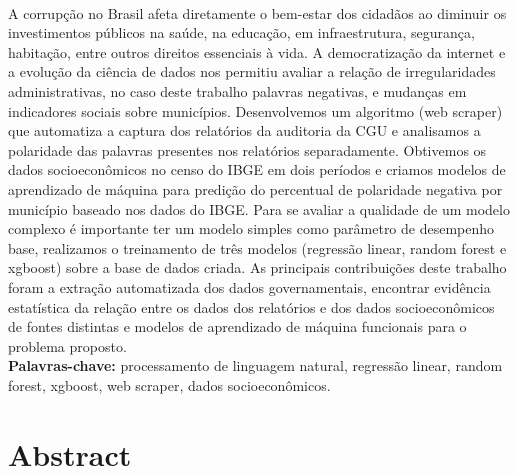 \documentclass[12pt,twoside,a4paper]{book}
\begin{document}
\\

A corrupção no Brasil afeta diretamente o bem-estar dos cidadãos ao diminuir os investimentos públicos na saúde, na educação, em infraestrutura, segurança, habitação, entre outros direitos essenciais à vida. A democratização da internet e a evolução da ciência de dados nos permitiu avaliar a relação de irregularidades administrativas, no caso deste trabalho palavras negativas, e mudanças em indicadores sociais sobre municípios. Desenvolvemos um algoritmo (web scraper) que automatiza a captura dos relatórios da auditoria da CGU e analisamos a polaridade das palavras presentes nos relatórios separadamente. Obtivemos os dados socioeconômicos no censo do IBGE em dois períodos e criamos modelos de aprendizado de máquina para predição do percentual de polaridade negativa por município baseado nos dados do IBGE. Para se avaliar a qualidade de um modelo complexo é importante ter um modelo simples como parâmetro de desempenho base, realizamos o treinamento de três modelos (regressão linear, random forest e xgboost) sobre a base de dados criada. As principais contribuições deste trabalho foram a extração automatizada dos dados governamentais, encontrar evidência estatística da relação entre os dados dos relatórios e dos dados socioeconômicos de fontes distintas e modelos de aprendizado de máquina funcionais para o problema proposto.
\\

\noindent \textbf{Palavras-chave:} processamento de linguagem natural, regressão linear, random forest, xgboost, web scraper, dados socioeconômicos.

\chapter*{Abstract}

\\
\end{document}
